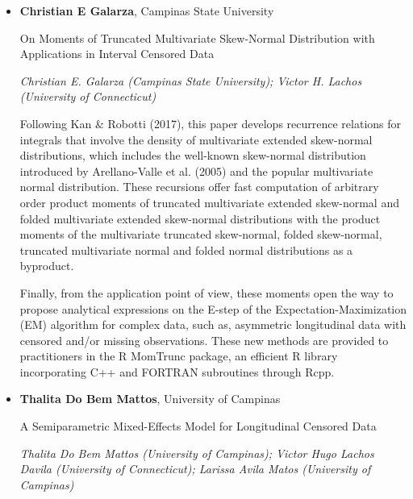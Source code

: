 \begin{itemize}
\item \textbf{Christian E Galarza}, Campinas State University

On Moments of Truncated Multivariate Skew-Normal Distribution with Applications in Interval Censored Data

\emph{\footnotesize Christian E. Galarza (Campinas State University); Victor H. Lachos (University of Connecticut)}

Following Kan \& Robotti (2017), this paper develops recurrence relations for integrals that involve the density of multivariate extended skew-normal distributions, which includes the well-known skew-normal distribution introduced by Arellano-Valle et al. (2005) and the popular multivariate normal distribution.  These recursions offer fast computation of arbitrary order product moments of truncated multivariate extended skew-normal  and folded multivariate extended skew-normal distributions with the product moments of the multivariate truncated skew-normal, folded skew-normal, truncated multivariate normal and folded normal distributions as a byproduct.

Finally, from the application point of view, these moments open the way to propose analytical expressions on the E-step of the Expectation-Maximization (EM) algorithm for complex data, such as, asymmetric longitudinal data with censored and/or missing  observations. These new methods are provided to practitioners in the {\sf R MomTrunc} package, an efficient {\sf R} library incorporating {\sf C++} and {\sf FORTRAN} subroutines through {\sf Rcpp}.

\item \textbf{Thalita Do Bem Mattos}, University of Campinas

A Semiparametric Mixed-Effects Model for Longitudinal  Censored Data

\emph{\footnotesize Thalita Do Bem Mattos (University of Campinas); Victor Hugo Lachos Davila (University of Connecticut); Larissa Avila Matos (University of Campinas)}


\end{itemize}
